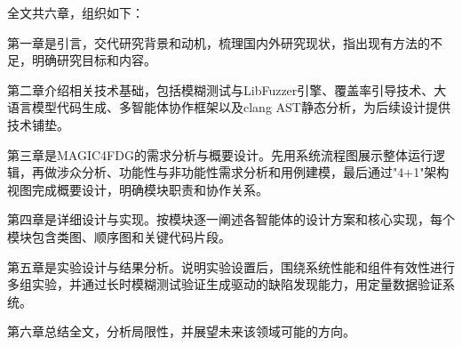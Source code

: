 全文共六章，组织如下：

第一章是引言，交代研究背景和动机，梳理国内外研究现状，指出现有方法的不足，明确研究目标和内容。

第二章介绍相关技术基础，包括模糊测试与LibFuzzer引擎、覆盖率引导技术、大语言模型代码生成、多智能体协作框架以及clang AST静态分析，为后续设计提供技术铺垫。

第三章是MAGIC4FDG的需求分析与概要设计。先用系统流程图展示整体运行逻辑，再做涉众分析、功能性与非功能性需求分析和用例建模，最后通过"4+1"架构视图完成概要设计，明确模块职责和协作关系。

第四章是详细设计与实现。按模块逐一阐述各智能体的设计方案和核心实现，每个模块包含类图、顺序图和关键代码片段。

第五章是实验设计与结果分析。说明实验设置后，围绕系统性能和组件有效性进行多组实验，并通过长时模糊测试验证生成驱动的缺陷发现能力，用定量数据验证系统。

第六章总结全文，分析局限性，并展望未来该领域可能的方向。